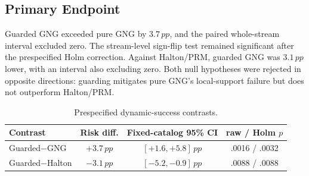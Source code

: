 \documentclass[letterpaper,10pt,conference]{ieeeconf}
\newcommand{\pp}{\,pp}
\begin{document}
\begin{table}[t]
\caption{Per-method results over 60 streams $\times$ 60 fixed scenes. Success intervals resample whole roadmap streams. Other values are descriptive; time and path-cost summaries use exact-valid paths only.}
\label{tab:methods}
\centering
\footnotesize
{}
\end{table}

\subsection{Primary Endpoint}
Guarded GNG exceeded pure GNG by $3.7\pp$, and the paired whole-stream interval excluded zero. The stream-level sign-flip test remained significant after the prespecified Holm correction. Against Halton/PRM, guarded GNG was $3.1\pp$ lower, with an interval also excluding zero. Both null hypotheses were rejected in opposite directions: guarding mitigates pure GNG's local-support failure but does not outperform Halton/PRM.

\begin{table}[t]
\caption{Prespecified dynamic-success contrasts.}
\label{tab:primary}
\centering
\footnotesize
\begin{tabular}{@{}lccc@{}}
\toprule
Contrast & Risk diff. & Fixed-catalog 95\% CI & raw / Holm $p$ \\
\midrule
Guarded$-$GNG & $+3.7\pp$ & $[+1.6,+5.8]\pp$ & .0016 / .0032 \\
Guarded$-$Halton & $-3.1\pp$ & $[-5.2,-0.9]\pp$ & .0088 / .0088 \\
\bottomrule
\end{tabular}
\end{table}
\end{document}
